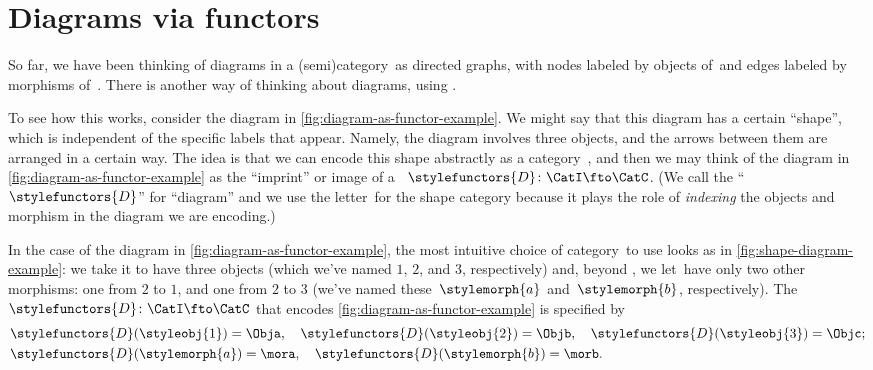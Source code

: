 
\section{Diagrams via functors}

So far, we have been thinking of diagrams in a (semi)category~\CatC as directed graphs, with nodes labeled by objects of~\CatC and edges labeled by morphisms of~\CatC.
There is another way of thinking about diagrams, using .

To see how this works, consider the diagram in \cref{fig:diagram-as-functor-example}.
We might say that this diagram has a certain ``shape'', which is independent of the specific labels that appear.
Namely, the diagram involves three objects, and the arrows between them are arranged in a certain way.
The idea is that we can encode this shape abstractly as a category~\CatI, and then we may think of the diagram in \cref{fig:diagram-as-functor-example} as the ``imprint'' or image of a ~$\stylefunctors{D}\colon \CatI \fto \CatC$.
(We call the  ``$\stylefunctors{D}$'' for ``diagram'' and we use the letter~\CatI for the shape category because it plays the role of \emph{indexing} the objects and morphism in the diagram we are encoding.)

\begin{marginfigure}
    \centering
    \caption{}
    \label{fig:diagram-as-functor-example}
\end{marginfigure}

\begin{marginfigure}
    \centering
    \caption{}
    \label{fig:shape-diagram-example}
\end{marginfigure}

In the case of the diagram in \cref{fig:diagram-as-functor-example}, the most intuitive choice of category~\CatI to use looks as in \cref{fig:shape-diagram-example}: we take it to have three objects (which we've named $1$, $2$, and $3$, respectively) and, beyond , we let~\CatI have only two other morphisms: one from $2$ to $1$, and one from $2$ to $3$ (we've named these~$\stylemorph{a}$ and~$\stylemorph{b}$, respectively).
The ~$\stylefunctors{D}\colon \CatI \fto \CatC$ that encodes \cref{fig:diagram-as-functor-example} is specified by
\begin{align}
     & \stylefunctors{D}(\styleobj{1}) = \Obja, \quad \stylefunctors{D}(\styleobj{2}) = \Objb, \quad \stylefunctors{D}(\styleobj{3}) = \Objc; \\
     & \stylefunctors{D}(\stylemorph{a}) = \mora, \quad \stylefunctors{D}(\stylemorph{b}) = \morb.
\end{align}

